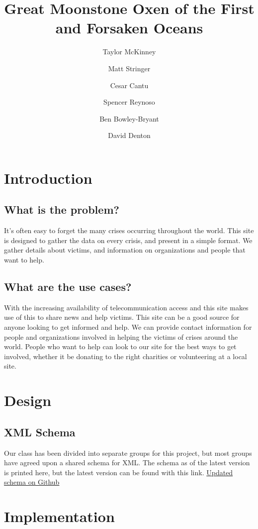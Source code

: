 \documentclass[12pt]{report}
\title{Great Moonstone Oxen of the First and Forsaken Oceans}
\author{
    Taylor McKinney
    \and Matt Stringer
    \and Cesar Cantu
    \and Spencer Reynoso
    \and Ben Bowley-Bryant
    \and David Denton}
\begin{document}
\maketitle

\section*{Introduction}
\subsection*{What is the problem?}
It's often easy to forget the many crises occurring throughout the world.
This site is designed to gather the data on every crisis, and present in a simple format.
We gather details about victims, and information on organizations and people that want to help.

\subsection*{What are the use cases?}
With the increasing availability of telecommunication access and this site makes use of this to share news and help victims.
This site can be a good source for anyone looking to get informed and help. 
We can provide contact information for people and organizations involved in helping the victims of crises around the world.
People who want to help can look to our site for the best ways to get involved, whether it be donating to the right charities or volunteering at a local site.

\newpage
\section*{Design}
\subsection*{XML Schema}
Our class has been divided into separate groups for this project, but most groups have agreed upon a shared schema for XML.
The schema as of the latest version is printed here, but the latest version can be found with this link.
\newline
\href{https://github.com/aaronj1335/cs373-wcdb1-schema/blob/master/WorldCrises.xsd.xml}{Updated schema on Github}

\newpage
\section*{Implementation}
\end{document}
